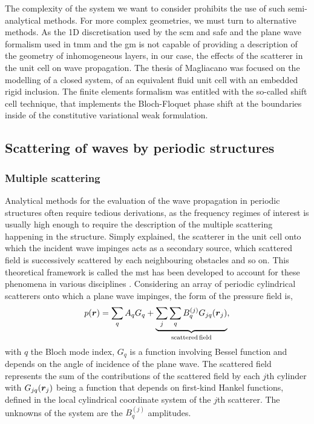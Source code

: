 The complexity of the system we want to consider prohibits the use of such semi-analytical methods. For more complex geometries, we must turn to alternative methods. As the 1D discretisation used by the \acrshort{scm} and \acrshort{safe} and the plane wave formalism used in \acrshort{tmm} and the \acrshort{gm} is not capable of providing a description of the geometry of inhomogeneous layers, in our case, the effects of the scatterer in the unit cell on wave propagation. The thesis of Magliacano\cite{magliacano2020a} was focused on the modelling of a closed system, of an equivalent fluid unit cell with an embedded rigid inclusion. The finite elements formalism was entitled with the so-called shift cell technique, that implements the Bloch-Floquet phase shift at the boundaries inside of the constitutive variational weak formulation. 


\subsection{Scattering of waves by periodic structures}

\subsubsection{Multiple scattering}
Analytical methods for the evaluation of the wave propagation in periodic structures often require tedious derivations, as the frequency regimes of interest is usually high enough to require the description of the multiple scattering happening in the structure. Simply explained, the scatterer in the unit cell onto which the incident wave impinges acts as a secondary source, which scattered field is successively scattered by each neighbouring obstacles and so on. This theoretical framework is called the \acrlong{mst} has been developed to account for these phenomena in various disciplines \cite{martin2006, jimenez2021}. Considering an array of periodic cylindrical scatterers onto which a plane wave impinges, the form of the pressure field is,
\begin{equation}
    p(\boldsymbol r) = \sum_q A_q G_q + \underbrace{\sum_j \sum_q B_q^{(j)} G_{jq}(\boldsymbol r_j)}_{\mathrm{scattered\,field}},
\end{equation} 
with $q$ the Bloch mode index, $G_q$ is a function involving Bessel function and depends on the angle of incidence of the plane wave. The scattered field represents the sum of the contributions of the scattered field by each $j$th cylinder with $G_{jq}(\boldsymbol r_j)$ being a function that depends on first-kind Hankel functions, defined in the local cylindrical coordinate system of the $j$th scatterer. The unknowns of the system are the $B_q^{(j)}$ amplitudes.

